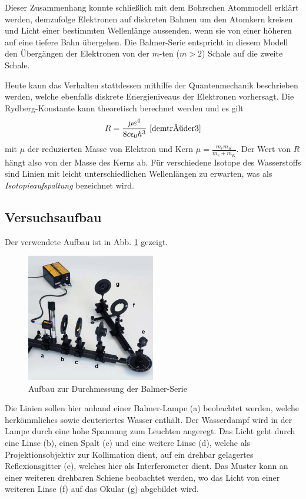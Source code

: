 \documentclass{article}
\begin{document}
Dieser Zusammenhang konnte schließlich mit dem Bohrschen Atommodell erklärt werden, demzufolge Elektronen auf diskreten Bahnen um den Atomkern kreisen
und Licht einer bestimmten Wellenlänge aussenden, wenn sie von einer höheren auf eine tiefere Bahn übergehen.
Die Balmer-Serie entspricht in diesem Modell den Übergängen der Elektronen von der $m$-ten ($m>2$) Schale auf die zweite Schale.

Heute kann das Verhalten stattdessen mithilfe der Quantenmechanik beschrieben werden, welche ebenfalls diskrete Energieniveaus der Elektronen vorhersagt.
Die Rydberg-Konstante kann theoretisch berechnet werden und es gilt
\begin{equation}
  R = \frac{\mu e^4}{8c\epsilon_0 h^3}~\cite[S.101]{demtröder3} \label{eq:rydberg-konstante} 
\end{equation}
mit $\mu$ der reduzierten Masse von Elektron und Kern $\mu = \frac{m_e m_K}{m_e+m_K}$.
Der Wert von $R$ hängt also von der Masse des Kerns ab. Für verschiedene Isotope des Wasserstoffs sind Linien mit leicht unterschiedlichen Wellenlängen
zu erwarten, was als \textit{Isotopieaufspaltung} bezeichnet wird.

\subsection{Versuchsaufbau}
Der verwendete Aufbau ist in Abb. \ref{fig:balmer-aufbau} gezeigt.
\begin{figure}[h]
  \centering
  \includegraphics[width=0.5\textwidth]{balmer-aufbau}
  \caption{Aufbau zur Durchmessung der Balmer-Serie \cite{Anleitung}}
  \label{fig:balmer-aufbau}
\end{figure}
Die Linien sollen hier anhand einer Balmer-Lampe (a) beobachtet werden, welche herkömmliches sowie deuteriertes Wasser enthält.
Der Wasserdampf wird in der Lampe durch eine hohe Spannung zum Leuchten angeregt. Das Licht geht durch eine Linse (b), einen Spalt (c) 
und eine weitere Linse (d), welche als Projektionsobjektiv zur Kollimation dient, auf ein drehbar gelagertes Reflexionsgitter (e), welches hier als Interferometer dient. Das Muster kann an einer weiteren
drehbaren Schiene beobachtet werden, wo das Licht von einer weiteren Linse (f) auf das Okular (g) abgebildet wird.
\end{document}
